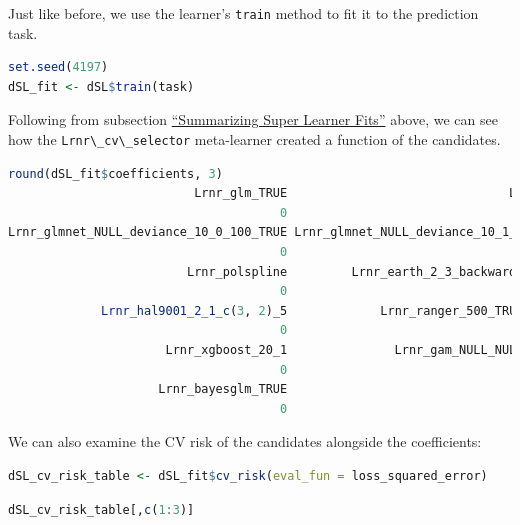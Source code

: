 \documentclass[
  12pt, krantz2,
]{krantz}
\newcommand{\passthrough}[1]{#1}
\newcommand{\1}{\mathbbm{1}}
\theoremstyle{definition}
\theoremstyle{definition}
\theoremstyle{definition}
\theoremstyle{definition}
\theoremstyle{remark}
\begin{document}
Just like before, we use the learner's \passthrough{\lstinline!train!} method to fit it to the
prediction task.

\begin{lstlisting}[language=R]
set.seed(4197)
dSL_fit <- dSL$train(task)
\end{lstlisting}

Following from subsection \href{https://tlverse.org/tlverse-handbook/sl3.html\#summarizing-super-learner-fits}{``Summarizing Super Learner
Fits''}
above, we can see how the \passthrough{\lstinline!Lrnr\_cv\_selector!} meta-learner created a function of
the candidates.

\begin{lstlisting}[language=R]
round(dSL_fit$coefficients, 3)
                          Lrnr_glm_TRUE                               Lrnr_mean 
                                      0                                       0 
Lrnr_glmnet_NULL_deviance_10_0_100_TRUE Lrnr_glmnet_NULL_deviance_10_1_100_TRUE 
                                      0                                       0 
                         Lrnr_polspline         Lrnr_earth_2_3_backward_0_1_0_0 
                                      0                                       1 
             Lrnr_hal9001_2_1_c(3, 2)_5             Lrnr_ranger_500_TRUE_none_1 
                                      0                                       0 
                      Lrnr_xgboost_20_1               Lrnr_gam_NULL_NULL_GCV.Cp 
                                      0                                       0 
                     Lrnr_bayesglm_TRUE 
                                      0 
\end{lstlisting}

We can also examine the CV risk of the candidates alongside the coefficients:

\begin{lstlisting}[language=R]
dSL_cv_risk_table <- dSL_fit$cv_risk(eval_fun = loss_squared_error)
\end{lstlisting}

\begin{lstlisting}[language=R]
dSL_cv_risk_table[,c(1:3)]
\end{lstlisting}
\end{document}
